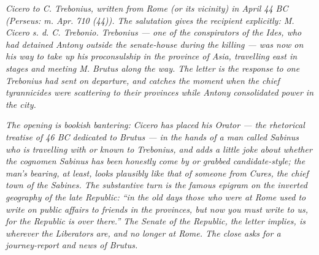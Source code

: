 
\textit{Cicero to C. Trebonius, written from Rome (or its vicinity)
in April 44 BC (Perseus: \textit{m. Apr. 710 (44)}). The salutation
gives the recipient explicitly: \textit{M. Cicero s. d. C. Trebonio}.
Trebonius --- one of the conspirators of the Ides, who had detained
Antony outside the senate-house during the killing --- was now on
his way to take up his proconsulship in the province of Asia,
travelling east in stages and meeting M. Brutus along the way. The
letter is the response to one Trebonius had sent on departure, and
catches the moment when the chief tyrannicides were scattering to
their provinces while Antony consolidated power in the city.}

\textit{The opening is bookish bantering: Cicero has placed his
\textit{Orator} --- the rhetorical treatise of 46 BC dedicated to
Brutus --- in the hands of a man called Sabinus who is travelling
with or known to Trebonius, and adds a little joke about whether
the cognomen \textit{Sabinus} has been honestly come by or grabbed
candidate-style; the man's bearing, at least, looks plausibly like
that of someone from Cures, the chief town of the Sabines. The
substantive turn is the famous epigram on the inverted geography of
the late Republic: ``in the old days those who were at Rome used
to write on public affairs to friends in the provinces, but now you
must write to us, for the Republic is over there.'' The Senate of
the Republic, the letter implies, is wherever the Liberators are,
and no longer at Rome. The close asks for a journey-report and news
of Brutus.}
